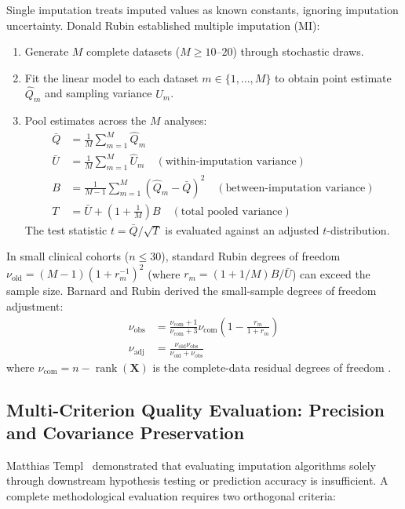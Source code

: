 \documentclass[11pt,oneside]{book}
\begin{document}
Single imputation treats imputed values as known constants, ignoring imputation uncertainty. Donald Rubin \cite{rubin1987multiple} established multiple imputation (MI):
\begin{enumerate}
    \item Generate $M$ complete datasets ($M \ge 10$--$20$) through stochastic draws.
    \item Fit the linear model to each dataset $m \in \{1, \dots, M\}$ to obtain point estimate $\hat{Q}_m$ and sampling variance $\hat{U}_m$.
    \item Pool estimates across the $M$ analyses:
    \begin{align}
    \bar{Q} &= \frac{1}{M}\sum_{m=1}^M \hat{Q}_m \\
    \bar{U} &= \frac{1}{M}\sum_{m=1}^M \hat{U}_m \quad (\text{within-imputation variance}) \\
    B &= \frac{1}{M - 1}\sum_{m=1}^M (\hat{Q}_m - \bar{Q})^2 \quad (\text{between-imputation variance}) \\
    T &= \bar{U} + \left(1 + \frac{1}{M}\right) B \quad (\text{total pooled variance})
    \end{align}
    The test statistic $t = \bar{Q} / \sqrt{T}$ is evaluated against an adjusted $t$-distribution.
\end{enumerate}

In small clinical cohorts ($n \le 30$), standard Rubin degrees of freedom $\nu_{\text{old}} = (M-1)(1 + r_m^{-1})^2$ (where $r_m = (1 + 1/M)B / \bar{U}$) can exceed the sample size. Barnard and Rubin \cite{barnard1999small} derived the small-sample degrees of freedom adjustment:
\begin{align}
\nu_{\text{obs}} &= \frac{\nu_{\text{com}} + 1}{\nu_{\text{com}} + 3} \nu_{\text{com}} \left(1 - \frac{r_m}{1 + r_m}\right) \\
\nu_{\text{adj}} &= \frac{\nu_{\text{old}} \nu_{\text{obs}}}{\nu_{\text{old}} + \nu_{\text{obs}}}
\end{align}
where $\nu_{\text{com}} = n - \operatorname{rank}(\mathbf{X})$ is the complete-data residual degrees of freedom \cite{barnard1999small}.

\subsection{Multi-Criterion Quality Evaluation: Precision and Covariance Preservation}

Matthias Templ~\cite{templ2023visualization} demonstrated that evaluating imputation algorithms solely through downstream hypothesis testing or prediction accuracy is insufficient. A complete methodological evaluation requires two orthogonal criteria:
\end{document}
